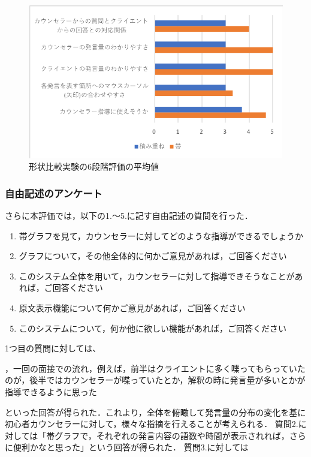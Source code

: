 \documentclass[shuuron]{kuee}
\begin{document}
\begin{figure}
  \begin{center}
    \includegraphics[width=\linewidth]{keijouAnketo.png}
  \end{center}
  \caption{形状比較実験の6段階評価の平均値}
  \label{fig:keijouAnketo}
\end{figure}


\subsubsection{自由記述のアンケート}

さらに本評価では，以下の1.〜5.に記す自由記述の質問を行った．

\begin{enumerate}
  \item 帯グラフを見て，カウンセラーに対してどのような指導ができるでしょうか
  \item グラフについて，その他全体的に何かご意見があれば，ご回答ください
  \item このシステム全体を用いて，カウンセラーに対して指導できそうなことがあれば，ご回答ください
  \item 原文表示機能について何かご意見があれば，ご回答ください
  \item このシステムについて，何か他に欲しい機能があれば，ご回答ください
\end{enumerate}

1つ目の質問に対しては、
\begin{itemize}

  ，一回の面接での流れ，例えば，前半はクライエントに多く喋ってもらっていたのが，後半ではカウンセラーが喋っていたとか，解釈の時に発言量が多いとかが指導できるように思った
\end{itemize}
といった回答が得られた．これより，全体を俯瞰して発言量の分布の変化を基に初心者カウンセラーに対して，様々な指摘を行えることが考えられる．
質問2.に対しては「帯グラフで，それぞれの発言内容の語数や時間が表示されれば，さらに便利かなと思った」という回答が得られた．
質問3.に対しては
\end{document}
